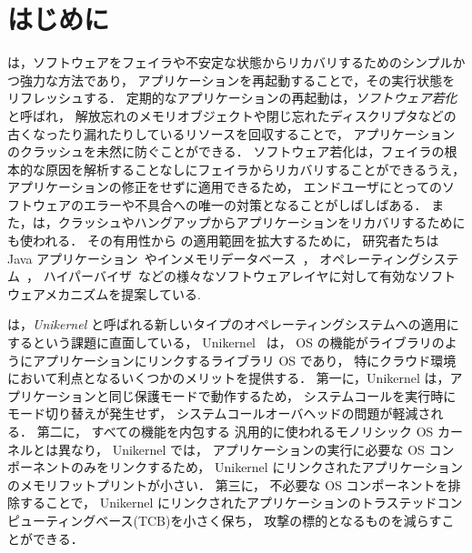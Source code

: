 \section{はじめに} \label{section:introduction}

\rr は，ソフトウェアをフェイラや不安定な状態からリカバリするためのシンプルかつ強力な方法であり，
アプリケーションを再起動することで，その実行状態をリフレッシュする．
定期的なアプリケーションの再起動は，\emph{ソフトウェア若化}と呼ばれ，
解放忘れのメモリオブジェクトや閉じ忘れたディスクリプタなどの古くなったり漏れたりしているリソースを回収することで，
アプリケーションのクラッシュを未然に防ぐことができる．
ソフトウェア若化は，フェイラの根本的な原因を解析することなしにフェイラからリカバリすることができるうえ，
アプリケーションの修正をせずに適用できるため，
エンドユーザにとってのソフトウェアのエラーや不具合への唯一の対策となることがしばしばある．
また，\rr は，クラッシュやハングアップからアプリケーションをリカバリするためにも使われる．
その有用性から \rr の適用範囲を拡大するために，
研究者たちは Java アプリケーション~\cite{CandeaEtAl-Microreboot}やインメモリデータベース~\cite{JumonjiEtAl-WoSAR17,JumonjiEtAl-IEICE2021}，
オペレーティングシステム~\cite{YamakitaEtAl-PBR,DepoutovitchEtAl-otherworld,KouraiEtAl-cachemind,TeradaEtAl-Dwarf,BovenziEtAl-ISSRE13}，
ハイパーバイザ~\cite{KouraiEtAl-Roothammer,KouraiEtAl-TDSC,LeEtAl-VEE11}などの様々なソフトウェアレイヤに対して有効なソフトウェアメカニズムを提案している.

\rr は，\emph{Unikernel} と呼ばれる新しいタイプのオペレーティングシステムへの適用にするという課題に直面している，
Unikernel ~\cite{MadhavapeddyEtAl-Unikernel,KivityEtAl-OSv,SartakovEtAl-ASPLOS21,KanteeEtAl-rumprun,KuenzerEtAl-Unikraft}は，
OS の機能がライブラリのようにアプリケーションにリンクするライブラリ OS であり，
特にクラウド環境において利点となるいくつかのメリットを提供する．
第一に，Unikernel は，アプリケーションと同じ保護モードで動作するため，
システムコールを実行時にモード切り替えが発生せず，
システムコールオーバヘッドの問題が軽減される．
第二に，
すべての機能を内包する
汎用的に使われるモノリシック OS カーネルとは異なり，
Unikernel では，
アプリケーションの実行に必要な OS コンポーネントのみをリンクするため，
Unikernel にリンクされたアプリケーションのメモリフットプリントが小さい．
第三に，
不必要な OS コンポーネントを排除することで，
Unikernel にリンクされたアプリケーションのトラステッドコンピューティングベース(TCB)を小さく保ち，
攻撃の標的となるものを減らすことができる．

